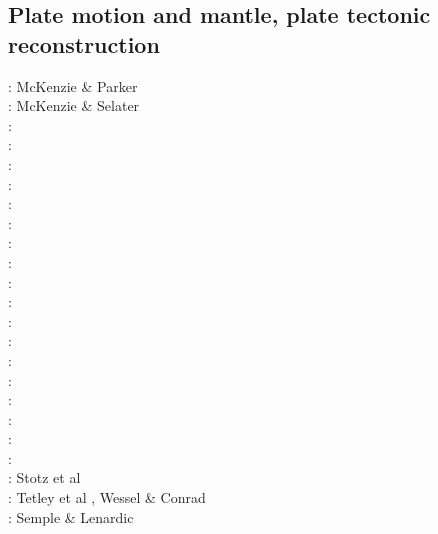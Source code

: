 \subsection{Plate motion and mantle, plate tectonic reconstruction}

{\scriptsize
\nineteensixtyseven: McKenzie \& Parker \cite{mcpa67}\\
\nineteenseventythree: McKenzie \& Selater \cite{mcse73}\\
\nineteenseventyfour: \cite{sosl74}\\
\nineteenseventyfive: \cite{harp75}\\
\nineteenninety: \cite{dega90}\\
\nineteenninetytwo: \cite{zieg92a}\\
\nineteenninetyfour: \cite{guto94}\\
\nineteenninetyseven: \cite{wean97b}\\
\nineteenninetyeight: \cite{zhgm98}\\
\nineteenninetynine: \cite{ribr99}\\
\twothousandone: \cite{yohk01}\\
\twothousandtwo: \cite{stoc02}\\
\twothousandthree: \cite{evan03}\cite{reta03}\\
\twothousandseven: \cite{zhzl07}\\
\twothousandnine: \cite{lizh09}\cite{vasv09}\cite{iabu09}\cite{scbs09}\\
\twothousandten: \cite{stto10}\cite{dega10}\\
\twothousandtwelve: \cite{huss12}\cite{gutz12}\cite{qumm12}\cite{holr12}\cite{dost12}\cite{shbs12}\\
\twothousandthirteen: \cite{mosq13}\cite{cost13}\\
\twothousandfifteen: \cite{yoha15}\\
\twothousandsixteen: \cite{pric16}\\
\twothousandseventeen: Stotz et al \cite{stid17}\\
\twothousandnineteen: Tetley et al \cite{tewg19}, Wessel \& Conrad \cite{weco19}\\
\twothousandtwenty: Semple \& Lenardic \cite{sele20}
}

